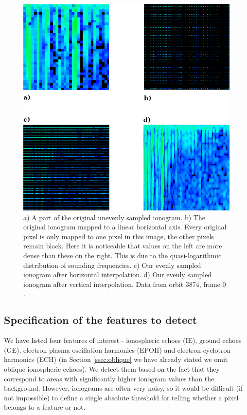 \begin{figure}[H]
	\centering
	\includegraphics[width=140mm]{images/even_and_uneven_ionogram.png}
	\caption{a) A part of the original unevenly sampled ionogram. b) The original ionogram mapped to a linear horizontal axis. Every original pixel is only mapped to one pixel in this image, the other pixels remain black. Here it is noticeable that values on the left are more dense than these on the right. This is due to the quasi-logarithmic distribution of sounding frequencies. c) Our evenly sampled ionogram after horizontal interpolation. d) Our evenly sampled ionogram after vertical interpolation. Data from orbit 3874, frame 0 \citep{FTP}.}
	\label{fig:even_uneven_iono}
\end{figure}

\subsection{Specification of the features to detect}
We have listed four features of interest - ionospheric echoes (IE), ground echoes (GE), electron plasma oscillation harmonics (EPOH) and electron cyclotron harmonics (ECH) (in Section \ref{ssec:oblique} we have already stated we omit oblique ionospheric echoes). We detect them based on the fact that they correspond to areas with significantly higher ionogram values than the background. However, ionograms are often very noisy, so it would be difficult (if not impossible) to define a single absolute threshold for telling whether a pixel belongs to a feature or not. 

